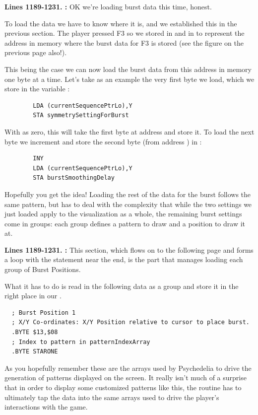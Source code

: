 \textbf{Lines 1189-1231. :} OK we're loading burst data this time, honest.

To load the data we have to know where it is, and we established this in the previous section. The player
pressed F3 so we stored  in  and  in 
to represent the address  in memory where the burst data for F3 is stored (see the figure on the previous
page also!).

This being the case we can now load the burst data from this address in memory one byte at a time. Let's take as an example the
very first byte we load, which we store in the variable :
\begin{lstlisting}
        LDA (currentSequencePtrLo),Y
        STA symmetrySettingForBurst
\end{lstlisting}

With  as zero, this will take the first byte at address  and store it. To load the next byte we increment 
and store the second byte (from address ) in :
\begin{lstlisting}
        INY 
        LDA (currentSequencePtrLo),Y
        STA burstSmoothingDelay
\end{lstlisting}

Hopefully you get the idea! Loading the rest of the data for the burst follows the same pattern, but has to deal with the complexity that
while the two settings we just loaded apply to the visualization as a whole, the remaining burst settings come in groups: each group defines
a pattern to draw and a position to draw it at.

\textbf{Lines 1189-1231. :} This section, which flows on to the following page and forms a loop with the
statement  near the end, is the part that manages loading each group of Burst Positions. 

What it has to do is read in the following data as a group and store it in the right place in our .
\begin{lstlisting}
  ; Burst Position 1
  ; X/Y Co-ordinates: X/Y Position relative to cursor to place burst.
  .BYTE $13,$08
  ; Index to pattern in patternIndexArray
  .BYTE STARONE
\end{lstlisting}
As you hopefully remember these are the arrays used by Psychedelia to drive the generation of patterns displayed on the screen. It really isn't much
of a surprise that in order to display some customized patterns like this, the routine has to ultimately tap the data into the same arrays used
to drive the player's interactions with the game.

